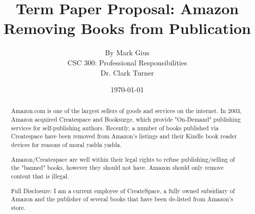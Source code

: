 \documentclass[12pt]{article}
\begin{document}
\title{\vfill Term Paper Proposal: Amazon Removing Books from Publication} %
\author{
 By Mark Gius \vspace{10pt} \\ 
CSC 300: Professional Responsibilities  \vspace{10pt} \\ 
Dr. Clark Turner \vspace{10pt} \\ 
}
\date{\today}

\maketitle

\vfill  %
\begin{abstract}
Amazon.com is one of the largest sellers of goods and services on the internet.  In 2003, Amazon acquired Createspace and Booksurge, which provide "On-Demand" publishing services for self-publishing authors. Recently, a number of books published via Createspace have been removed from Amazon's listings and their Kindle book reader devices for reasons of moral yadda yadda.  

Amazon/Createspace are well within their legal rights to refuse publishing/selling of the "banned" books, however they should not have. Amazon should only remove content that is illegal. 

Full Disclosure: I am a current employee of CreateSpace, a fully owned subsidiary of Amazon and the publisher of several books that have been de-listed from Amazon's store.
\end{abstract}

\thispagestyle{empty} %
\newpage


\end{document}
